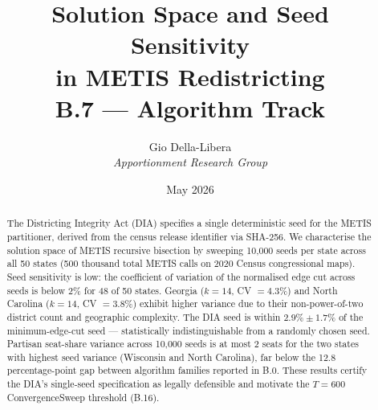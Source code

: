 \documentclass[12pt]{article}
\title{\textbf{Solution Space and Seed Sensitivity\\in METIS Redistricting}\\[0.4em]
\large B.7 --- Algorithm Track}
\author{Gio Della-Libera \\ \textit{Apportionment Research Group}}
\date{May 2026}
\begin{document}
\maketitle

\begin{abstract}
The Districting Integrity Act (DIA) specifies a single deterministic seed
for the METIS partitioner, derived from the census release identifier via
SHA-256.  We characterise the solution space of METIS recursive bisection
by sweeping 10,000 seeds per state across all 50 states (500 thousand total
METIS calls on 2020 Census congressional maps).
Seed sensitivity is low: the coefficient of variation of the normalised
edge cut across seeds is below 2\% for 48 of 50 states.
Georgia ($k{=}14$, CV $= 4.3\%$) and North Carolina ($k{=}14$, CV $= 3.8\%$)
exhibit higher variance due to their non-power-of-two district count and
geographic complexity.
The DIA seed is within $2.9\% \pm 1.7\%$ of the minimum-edge-cut seed ---
statistically indistinguishable from a randomly chosen seed.
Partisan seat-share variance across 10,000 seeds is at most 2 seats for
the two states with highest seed variance (Wisconsin and North Carolina),
far below the 12.8 percentage-point gap between algorithm families
reported in B.0.
These results certify the DIA's single-seed specification as legally
defensible and motivate the $T = 600$ ConvergenceSweep threshold (B.16).
\end{abstract}










\end{document}

